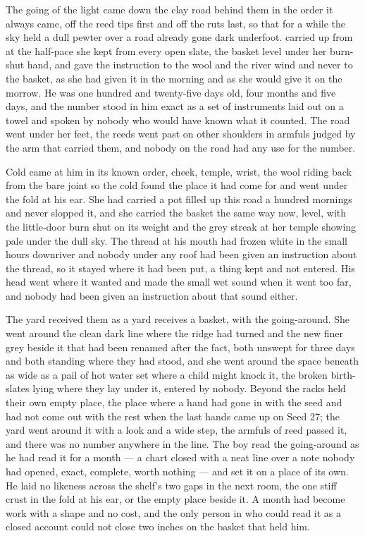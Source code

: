The going of the light came down the clay road behind them in the order it always came, off the reed tips first and off the ruts last, so that for a while the sky held a dull pewter over a road already gone dark underfoot.  carried  up from  at the half-pace she kept from every open slate, the basket level under her burn-shut hand, and gave the instruction to the wool and the river wind and never to the basket, as she had given it in the morning and as she would give it on the morrow. He was one hundred and twenty-five days old, four months and five days, and the number stood in him exact as a set of instruments laid out on a towel and spoken by nobody who would have known what it counted. The road went under her feet, the reeds went past on other shoulders in armfuls judged by the arm that carried them, and nobody on the road had any use for the number.

Cold came at him in its known order, cheek, temple, wrist, the wool riding back from the bare joint so the cold found the place it had come for and went under the fold at his ear. She had carried a pot filled up this road a hundred mornings and never slopped it, and she carried the basket the same way now, level, with the little-door burn shut on its weight and the grey streak at her temple showing pale under the dull sky. The thread at his mouth had frozen white in the small hours downriver and nobody under any roof had been given an instruction about the thread, so it stayed where it had been put, a thing kept and not entered. His head went where it wanted and made the small wet sound when it went too far, and nobody had been given an instruction about that sound either.

The yard received them as a yard receives a basket, with the going-around. She went around the clean dark line where the  ridge had turned and the new finer grey beside it that had been renamed  after the fact, both unswept for three days and both standing where they had stood, and she went around the space beneath  as wide as a pail of hot water set where a child might knock it, the broken birth-slates lying where they lay under it, entered by nobody. Beyond the racks  held their own empty place, the place where a hand had gone in with the seed and had not come out with the rest when the last hands came up on Seed 27; the yard went around it with a look and a wide step, the armfuls of reed passed it, and there was no number anywhere in the line. The boy read the going-around as he had read it for a month --- a chart closed with a neat line over a note nobody had opened, exact, complete, worth nothing --- and set it on a place of its own. He laid no likeness across the shelf's two gaps in the next room, the one stiff crust in the fold at his ear, or the empty place beside it. A month had become work with a shape and no cost, and the only person in  who could read it as a closed account could not close two inches on the basket that held him.

